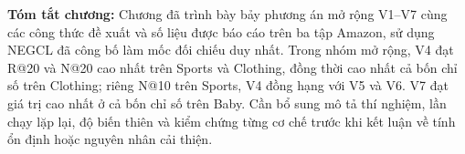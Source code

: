 \noindent\textbf{Tóm tắt chương:}
Chương đã trình bày bảy phương án mở rộng V1--V7 cùng các công thức đề xuất và số liệu được báo cáo trên ba tập Amazon, sử dụng NEGCL đã công bố làm mốc đối chiếu duy nhất. Trong nhóm mở rộng, V4 đạt R@20 và N@20 cao nhất trên Sports và Clothing, đồng thời cao nhất cả bốn chỉ số trên Clothing; riêng N@10 trên Sports, V4 đồng hạng với V5 và V6. V7 đạt giá trị cao nhất ở cả bốn chỉ số trên Baby. Cần bổ sung mô tả thí nghiệm, lần chạy lặp lại, độ biến thiên và kiểm chứng từng cơ chế trước khi kết luận về tính ổn định hoặc nguyên nhân cải thiện.
